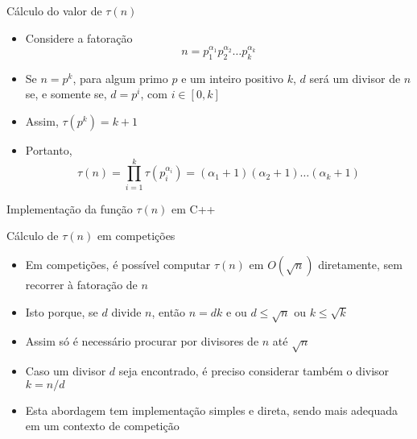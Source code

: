 \begin{frame}[fragile]{Cálculo do valor de $\tau(n)$}

    \begin{itemize}
        \item  Considere a fatoração
$$
    n = p_1^{\alpha_1}p_2^{\alpha_2}\ldots p_k^{\alpha_k}
$$

        \item Se $n = p^k$, para algum primo $p$ e um inteiro positivo $k$, $d$ será um divisor de $n$ se, e somente se, $d = p^i$, com $i\in [0, k]$

        \item Assim, $\tau(p^k) = k + 1$

        \item  Portanto,
$$
    \tau(n) = \prod_{i = 1}^k \tau(p_i^{\alpha_i}) = (\alpha_1 + 1)(\alpha_2 + 1)\ldots (\alpha_k + 1)
$$
    \end{itemize}

\end{frame}

\begin{frame}[fragile]{Implementação da função $\tau(n)$ em C++}
\end{frame}

\begin{frame}[fragile]{Cálculo de $\tau(n)$ em competições}

    \begin{itemize}
        \item Em competições, é possível computar $\tau(n)$ em $O(\sqrt{n})$ diretamente, sem recorrer à fatoração de $n$

        \item Isto porque, se $d$ divide $n$, então $n = dk$ e ou $d\leq \sqrt{n}$ ou $k \leq \sqrt{k}$

        \item Assim só é necessário procurar por divisores de $n$ até $\sqrt{n}$

        \item Caso um divisor $d$ seja encontrado, é preciso considerar também o divisor $k = n/d$

        \item Esta abordagem tem implementação simples e direta, sendo mais adequada em um contexto de competição
    \end{itemize}

\end{frame}

